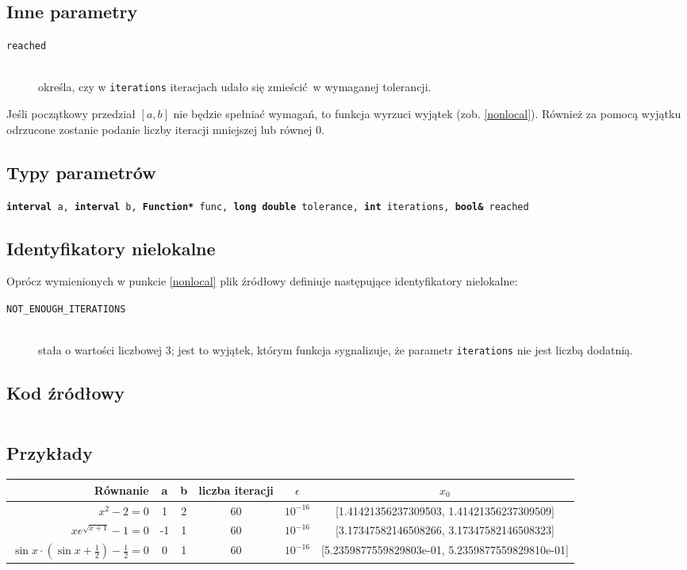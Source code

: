\documentclass[12pt]{article}
\begin{document}
		\subsection{Inne parametry}
			\begin{description}
				\item[\texttt{reached}] \hfill\\ określa, czy w \texttt{iterations} iteracjach udało się zmieścić w wymaganej tolerancji.
			\end{description}

      Jeśli początkowy przedział $[a, b]$ nie będzie spełniać wymagań, to funkcja wyrzuci wyjątek (zob. \ref{nonlocal}).
      Również za pomocą wyjątku odrzucone zostanie podanie liczby iteracji mniejszej lub równej 0.

		\subsection{Typy parametrów}
			\texttt{\textbf{interval} a, \textbf{interval} b, \textbf{Function*} func, \textbf{long double} tolerance, \textbf{int} iterations, \textbf{bool\&} reached}

		\subsection{Identyfikatory nielokalne}
      Oprócz wymienionych w punkcie \ref{nonlocal} plik źródłowy definiuje następujące identyfikatory nielokalne:

      \begin{description}
				\item[\texttt{NOT\_ENOUGH\_ITERATIONS}] \hfill\\
					stała o wartości liczbowej 3; jest to wyjątek, którym funkcja sygnalizuje, że parametr \texttt{iterations} nie jest liczbą dodatnią.
			\end{description}

		\subsection{Kod źródłowy}
		  \inputminted[firstline=3, lastline=41]{c++}{../solvers/bisection.cpp}

		\subsection{Przykłady}
			\begin{tabular}{|r|c|c|c|c||c|}
				\hline
				Równanie & a & b & liczba iteracji & $\epsilon$ & $x_0$ \\\hline

				$x^2 - 2 = 0$ & 1 & 2 & 60 & $10^{-16}$ & [1.41421356237309503, 1.41421356237309509] \\\hline
				$xe^{\sqrt{x+1}} - 1 = 0$ & -1 & 1 & 60 & $10^{-16}$ & [3.17347582146508266, 3.17347582146508323] \\\hline
				$\sin{x} \cdot (\sin{x} + \frac{1}{2}) - \frac{1}{2} = 0$ & 0 & 1 & 60 & $10^{-16}$ & [5.2359877559829803e-01, 5.2359877559829810e-01] \\\hline

			\end{tabular}
\end{document}
